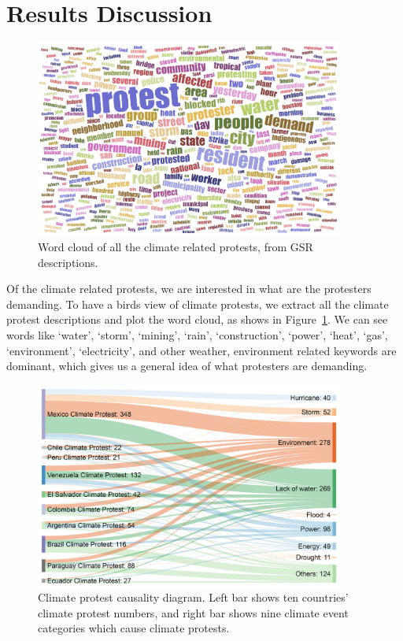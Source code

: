 \section{Results Discussion}

\begin{figure}[ht]
\centerline
{\includegraphics[width=4in]{figures/Climate_word_cloud.png}}
\caption{Word cloud of all the climate related protests, from GSR descriptions.}
\label{wordcloud}
\end{figure}

Of the climate related protests, we are interested in what are the protesters demanding. To have a birds view of climate protests, we extract all the climate protest descriptions and plot the word cloud, as shows in Figure~\ref{wordcloud}. We can see words like `water', `storm', `mining', `rain', `construction', `power', `heat', `gas', `environment', `electricity', and other weather, environment related keywords are dominant, which gives us a general idea of what protesters are demanding.

\begin{figure}[t]
\centerline
{\includegraphics[width=4in]{figures/causality1.png}}
\caption{Climate protest causality diagram. Left bar shows ten countries' climate protest numbers, and right bar shows nine climate event categories which cause climate protests.}
\label{causality}
\end{figure}

